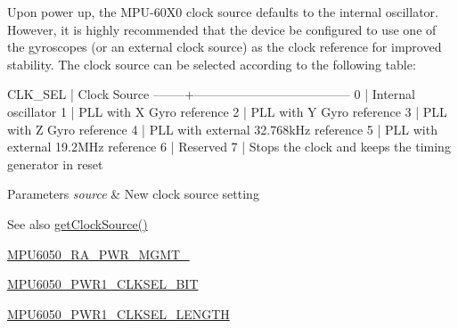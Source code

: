 Upon power up, the M\+P\+U-\/60\+X0 clock source defaults to the internal oscillator. However, it is highly recommended that the device be configured to use one of the gyroscopes (or an external clock source) as the clock reference for improved stability. The clock source can be selected according to the following table\+:


\begin{DoxyPre}
CLK\_SEL | Clock Source
--------+--------------------------------------
0       | Internal oscillator
1       | PLL with X Gyro reference
2       | PLL with Y Gyro reference
3       | PLL with Z Gyro reference
4       | PLL with external 32.768kHz reference
5       | PLL with external 19.2MHz reference
6       | Reserved
7       | Stops the clock and keeps the timing generator in reset
\end{DoxyPre}



\begin{DoxyParams}{Parameters}
{\em source} & New clock source setting \\
\hline
\end{DoxyParams}
\begin{DoxySeeAlso}{See also}
\hyperlink{classMPU6050_a8ed670258a805807b5102cdc5d0996a8}{get\+Clock\+Source()} 

\hyperlink{MPU6050_8h_ac6c83146165a2307ac7155d4fa566df4}{M\+P\+U6050\+\_\+\+R\+A\+\_\+\+P\+W\+R\+\_\+\+M\+G\+M\+T\+\_} 

\hyperlink{MPU6050_8h_a77a4abb41f9adaa799cccf6402443cb9}{M\+P\+U6050\+\_\+\+P\+W\+R1\+\_\+\+C\+L\+K\+S\+E\+L\+\_\+\+B\+IT} 

\hyperlink{MPU6050_8h_a211c99bb94df09b85cf838b2a5eb7167}{M\+P\+U6050\+\_\+\+P\+W\+R1\+\_\+\+C\+L\+K\+S\+E\+L\+\_\+\+L\+E\+N\+G\+TH} 
\end{DoxySeeAlso}
